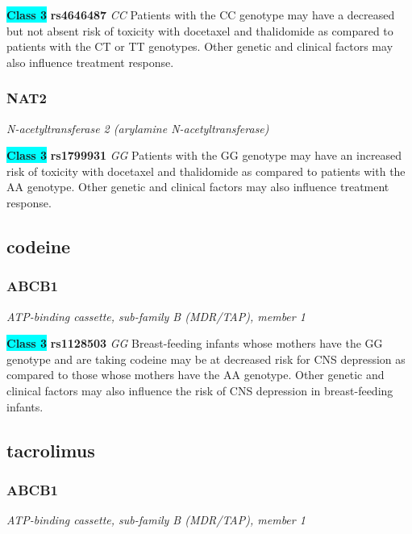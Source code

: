 \documentclass{report}
\begin{document}
\textbf{\colorbox{cyan} {Class 3}} \textbf{ rs4646487 } \textit{ CC }
Patients with the CC genotype may have a decreased but not absent risk of toxicity with docetaxel and thalidomide as compared to patients with the CT or TT genotypes. Other genetic and clinical factors may also influence treatment response.\newline\subsubsection{ NAT2 }
\textit{ N-acetyltransferase 2 (arylamine N-acetyltransferase) }

\textbf{\colorbox{cyan} {Class 3}} \textbf{ rs1799931 } \textit{ GG }
Patients with the GG genotype may have an increased risk of toxicity with docetaxel and thalidomide as compared to patients with the AA genotype. Other genetic and clinical factors may also influence treatment response.\newline\subsection{ codeine }\subsubsection{ ABCB1 }
\textit{ ATP-binding cassette, sub-family B (MDR/TAP), member 1 }

\textbf{\colorbox{cyan} {Class 3}} \textbf{ rs1128503 } \textit{ GG }
Breast-feeding infants whose mothers have the GG genotype and are taking codeine may be at decreased risk for CNS depression as compared to those whose mothers have the AA genotype. Other genetic and clinical factors may also influence the risk of CNS depression in breast-feeding infants. \newline\subsection{ tacrolimus }\subsubsection{ ABCB1 }
\textit{ ATP-binding cassette, sub-family B (MDR/TAP), member 1 }
\end{document}
